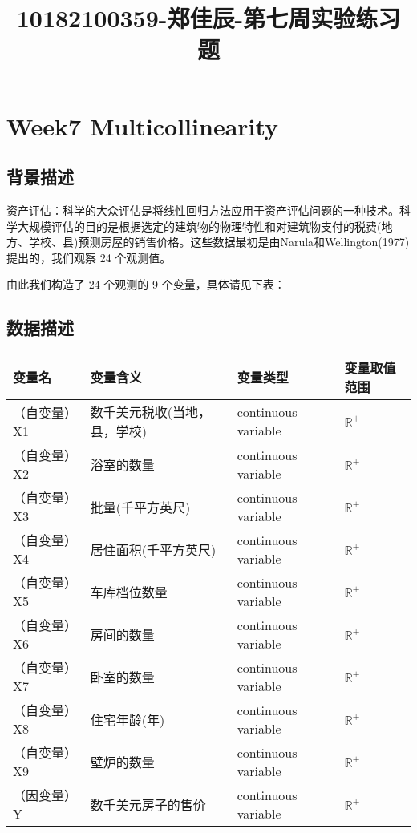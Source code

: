 \documentclass[11pt]{ctexart}
\title{10182100359-郑佳辰-第七周实验练习题}
\begin{document}
    
    \maketitle
    
    

    
    \hypertarget{week7-multicollinearity}{%
\section{Week7 Multicollinearity}\label{week7-multicollinearity}}

\hypertarget{ux80ccux666fux63cfux8ff0}{%
\subsection{背景描述}\label{ux80ccux666fux63cfux8ff0}}

资产评估：科学的大众评估是将线性回归方法应用于资产评估问题的一种技术。科学大规模评估的目的是根据选定的建筑物的物理特性和对建筑物支付的税费(地方、学校、县)预测房屋的销售价格。这些数据最初是由Narula和Wellington(1977)提出的，我们观察
24 个观测值。

由此我们构造了 24 个观测的 9 个变量，具体请见下表：

\hypertarget{ux6570ux636eux63cfux8ff0}{%
\subsection{数据描述}\label{ux6570ux636eux63cfux8ff0}}

\begin{longtable}[]{llll}
\toprule
变量名 & 变量含义 & 变量类型 & 变量取值范围 \\
\midrule
\endhead
（自变量）X1 & 数千美元税收(当地，县，学校) & continuous variable &
\(\mathbb{R}^+\) \\
（自变量）X2 & 浴室的数量 & continuous variable & \(\mathbb{R}^+\) \\
（自变量）X3 & 批量(千平方英尺) & continuous variable &
\(\mathbb{R}^+\) \\
（自变量）X4 & 居住面积(千平方英尺) & continuous variable &
\(\mathbb{R}^+\) \\
（自变量）X5 & 车库档位数量 & continuous variable & \(\mathbb{R}^+\) \\
（自变量）X6 & 房间的数量 & continuous variable & \(\mathbb{R}^+\) \\
（自变量）X7 & 卧室的数量 & continuous variable & \(\mathbb{R}^+\) \\
（自变量）X8 & 住宅年龄(年) & continuous variable & \(\mathbb{R}^+\) \\
（自变量）X9 & 壁炉的数量 & continuous variable & \(\mathbb{R}^+\) \\
（因变量）Y & 数千美元房子的售价 & continuous variable &
\(\mathbb{R}^+\) \\
\bottomrule
\end{longtable}
\end{document}

